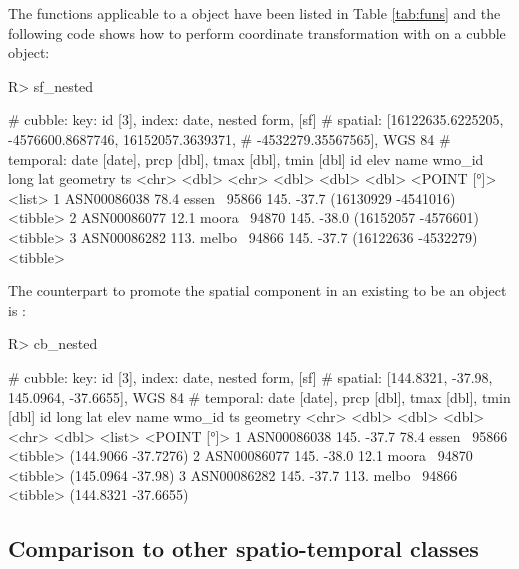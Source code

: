 \documentclass[
  shortnames]{jss}
\begin{document}
The  functions applicable to a  object have been listed in Table \ref{tab:funs} and the following code shows how to perform coordinate transformation with  on a cubble object:

\begin{CodeChunk}
\begin{CodeInput}
R> sf_nested %
\end{CodeInput}
\begin{CodeOutput}
# cubble:   key: id [3], index: date, nested form, [sf]
# spatial:  [16122635.6225205, -4576600.8687746, 16152057.3639371,
#   -4532279.35567565], WGS 84
# temporal: date [date], prcp [dbl], tmax [dbl], tmin [dbl]
  id           elev name   wmo_id  long   lat            geometry ts      
  <chr>       <dbl> <chr>   <dbl> <dbl> <dbl>         <POINT [°]> <list>  
1 ASN00086038  78.4 essen~  95866  145. -37.7 (16130929 -4541016) <tibble>
2 ASN00086077  12.1 moora~  94870  145. -38.0 (16152057 -4576601) <tibble>
3 ASN00086282 113.  melbo~  94866  145. -37.7 (16122636 -4532279) <tibble>
\end{CodeOutput}
\end{CodeChunk}

The counterpart to promote the spatial component in an existing  to be an  object is :

\begin{CodeChunk}
\begin{CodeInput}
R> cb_nested %
\end{CodeInput}
\begin{CodeOutput}
# cubble:   key: id [3], index: date, nested form, [sf]
# spatial:  [144.8321, -37.98, 145.0964, -37.6655], WGS 84
# temporal: date [date], prcp [dbl], tmax [dbl], tmin [dbl]
  id           long   lat  elev name   wmo_id ts                  geometry
  <chr>       <dbl> <dbl> <dbl> <chr>   <dbl> <list>           <POINT [°]>
1 ASN00086038  145. -37.7  78.4 essen~  95866 <tibble> (144.9066 -37.7276)
2 ASN00086077  145. -38.0  12.1 moora~  94870 <tibble>   (145.0964 -37.98)
3 ASN00086282  145. -37.7 113.  melbo~  94866 <tibble> (144.8321 -37.6655)
\end{CodeOutput}
\end{CodeChunk}

\hypertarget{tidyverse}{%
\subsection{Comparison to other spatio-temporal classes}\label{tidyverse}}
\end{document}
